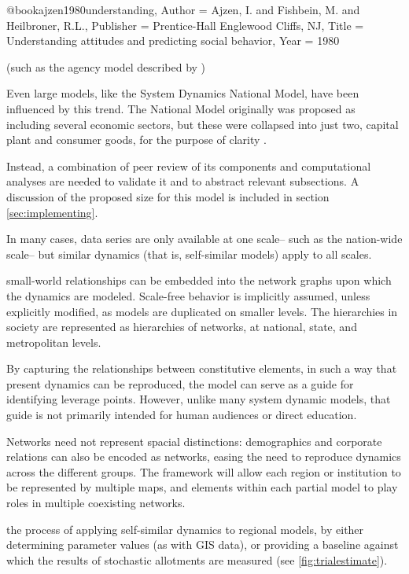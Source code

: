 @book{ajzen1980understanding,
	Author = {Ajzen, I. and Fishbein, M. and Heilbroner, R.L.},
	Publisher = {Prentice-Hall Englewood Cliffs, NJ},
	Title = {{Understanding attitudes and predicting social behavior}},
	Year = {1980}}


 (such as the agency model described by \citet{ajzen1980understanding}) 

Even large models, like the System Dynamics National Model, have been influenced by this trend.  The National Model originally was proposed as including several economic sectors, but these were collapsed into just two, capital plant and consumer goods, for the purpose of clarity \citep{Forrester1991}.

  Instead, a combination of peer review of its components and computational analyses are needed to validate it and to abstract relevant subsections.  A discussion of the proposed size for this model is included in section \ref{sec:implementing}.

  In many cases, data series are only available at one scale-- such as the nation-wide scale-- but similar dynamics (that is, self-similar models) apply to all scales. 

small-world relationships can be embedded into the network graphs upon which the dynamics are modeled.  Scale-free behavior is implicitly assumed, unless explicitly modified, as models are duplicated on smaller levels.  The hierarchies in society are represented as hierarchies of networks, at national, state, and metropolitan levels.  

By capturing the relationships between constitutive elements, in such a way that present dynamics can be reproduced, the model can serve as a guide for identifying leverage points.  However, unlike many system dynamic models, that guide is not primarily intended for human audiences or direct education.  

  Networks need not represent spacial distinctions: demographics and corporate relations can also be encoded as networks, easing the need to reproduce dynamics across the different groups.  The framework will allow each region or institution to be represented by multiple maps, and elements within each partial model to play roles in multiple coexisting networks.

the process of applying self-similar dynamics to regional models, by either determining parameter values (as with GIS data), or providing a baseline against which the results of stochastic allotments are measured (see \ref{fig:trialestimate}).

